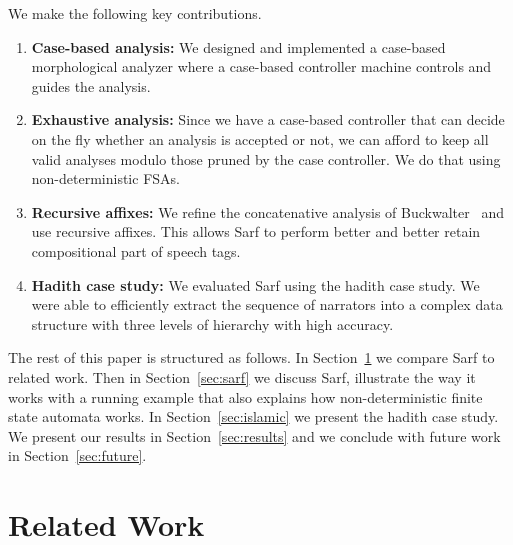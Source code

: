 \documentclass[11pt,letterpaper]{article}
\begin{document}

We make the following key contributions. 
\begin{enumerate}
\item {\bf Case-based analysis:}  We designed and implemented
a case-based morphological analyzer where a case-based controller
machine controls and guides the analysis. 
\item {\bf Exhaustive analysis:} Since we have a case-based 
controller that can decide on the fly whether an analysis is 
accepted or not, we can afford to keep all valid analyses modulo
those pruned by the case controller. 
We do that using non-deterministic FSAs. 
\item {\bf Recursive affixes:}
We refine the concatenative analysis of 
Buckwalter~  and use recursive affixes. 
This allows Sarf to perform better and 
better retain compositional part of speech
tags.
\item {\bf Hadith case study:}
We evaluated Sarf using the hadith case study. We were able to
efficiently extract the sequence of narrators into a complex
data structure with three levels of hierarchy with high accuracy. 
\end{enumerate}




The rest of this paper is structured as follows. In Section~\ref{sec:related}
we compare Sarf to related work. Then in Section~\ref{sec:sarf}
we discuss Sarf, illustrate the way it works with a running example
that also explains how non-deterministic finite state automata
works. In Section~\ref{sec:islamic} we present the hadith case
study. We present our results in Section~\ref{sec:results}
and we conclude with future work in Section~\ref{sec:future}.


\section{Related Work }
\label{sec:related}
\end{document}
